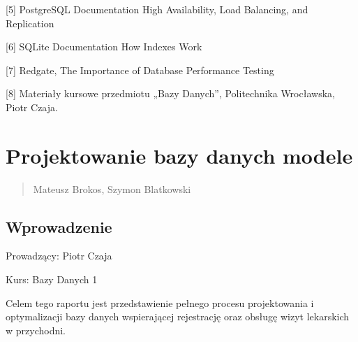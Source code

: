\documentclass[a4paper,11pt,openany,english]{sphinxmanual}
\begin{document}
\sphinxAtStartPar
{[}5{]} PostgreSQL Documentation \textendash{} High Availability, Load Balancing, and Replication

\sphinxAtStartPar
{[}6{]} SQLite Documentation \textendash{} How Indexes Work

\sphinxAtStartPar
{[}7{]} Redgate, The Importance of Database Performance Testing

\sphinxAtStartPar
{[}8{]} Materiały kursowe przedmiotu „Bazy Danych”, Politechnika Wrocławska, Piotr Czaja.

\sphinxstepscope


\chapter{Projektowanie bazy danych \sphinxhyphen{} modele}
\label{\detokenize{rozdzial3/index:projektowanie-bazy-danych-modele}}\label{\detokenize{rozdzial3/index::doc}}\begin{quote}\begin{description}
\sphinxAtStartPar
Mateusz Brokos, Szymon Blatkowski

\end{description}\end{quote}


\section{Wprowadzenie}
\label{\detokenize{rozdzial3/index:wprowadzenie}}
\sphinxAtStartPar
Prowadzący: Piotr Czaja

\sphinxAtStartPar
Kurs: Bazy Danych 1

\sphinxAtStartPar
Celem tego raportu jest przedstawienie pełnego procesu projektowania i optymalizacji bazy danych wspierającej rejestrację oraz obsługę wizyt lekarskich w przychodni.
\end{document}
